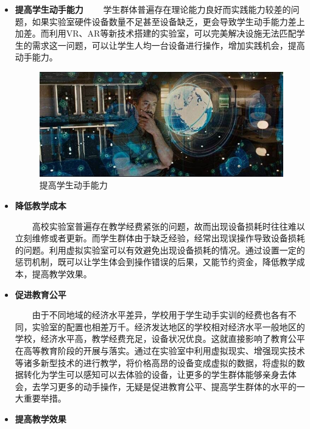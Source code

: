 \documentclass{imutthesis}
\begin{document}
\begin{itemize}
    \item \textbf{提高学生动手能力}
    $\qquad$学生群体普遍存在理论能力良好而实践能力较差的问题，如果实验室硬件设备数量不足甚至设备缺乏，更会导致学生动手能力差上加差。而利用VR、AR等新技术搭建的实验室，可以完美解决设施无法匹配学生的需求这一问题，可以让学生人均一台设备进行操作，增加实践机会，提高动手能力。
    \begin{figure}[htbp]
        \centering
        \includegraphics{托尼.jpg}
        \caption{提高学生动手能力}
    \end{figure}
    \item \textbf{降低教学成本}
    
    $\qquad$高校实验室普遍存在教学经费紧张的问题，故而出现设备损耗时往往难以立刻维修或者更新。而学生群体由于缺乏经验，经常出现误操作导致设备损耗的问题。利用虚拟实验室可以有效避免出现设备损耗的情况。通过设置一定的惩罚机制，既可以让学生体会到操作错误的后果，又能节约资金，降低教学成本，提高教学效果。
    \item \textbf{促进教育公平}
    
    $\qquad$由于不同地域的经济水平差异，学校用于学生动手实训的经费也各有不同，实验室的配置也相差万千。经济发达地区的学校相对经济水平一般地区的学校，经济水平高，教学经费充足，设备状况优良。这就直接影响了教育公平在高等教育阶段的开展与落实。通过在实验室中利用虚拟现实、增强现实技术等诸多新型技术的进行教学，将价格高昂的设备变成虚拟的数据，将虚拟的数据转化为学生可以感知可以去体验的设备，让更多的学生群体能够亲身去体会，去学习更多的动手操作，无疑是促进教育公平、提高学生群体的水平的一大重要举措。 
    \item \textbf{提高教学效果}
    

\end{itemize}
\end{document}
